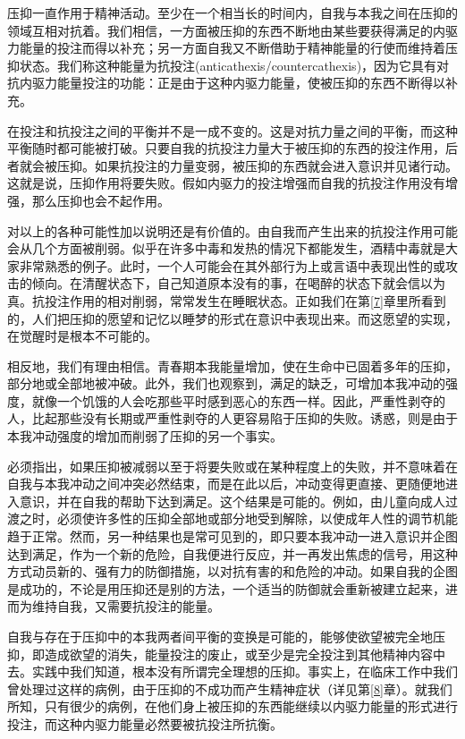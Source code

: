 \documentclass[UTF8,10pt,a4paper,openany]{book}
\begin{document}
压抑一直作用于精神活动。至少在一个相当长的时间内，自我与本我之间在压抑的领域互相对抗着。我们相信，一方面被压抑的东西不断地由某些要获得满足的内驱力能量的投注而得以补充；另一方面自我又不断借助于精神能量的行使而维持着压抑状态。我们称这种能量为抗投注(anticathexis/countercathexis)，因为它具有对抗内驱力能量投注的功能：正是由于这种内驱力能量，使被压抑的东西不断得以补充。

在投注和抗投注之间的平衡并不是一成不变的。这是对抗力量之间的平衡，而这种平衡随时都可能被打破。只要自我的抗投注力量大于被压抑的东西的投注作用，后者就会被压抑。如果抗投注的力量变弱，被压抑的东西就会进入意识并见诸行动。这就是说，压抑作用将要失败。假如内驱力的投注增强而自我的抗投注作用没有增强，那么压抑也会不起作用。

对以上的各种可能性加以说明还是有价值的。由自我而产生出来的抗投注作用可能会从几个方面被削弱。似乎在许多中毒和发热的情况下都能发生，酒精中毒就是大家非常熟悉的例子。此时，一个人可能会在其外部行为上或言语中表现出性的或攻击的倾向。在清醒状态下，自己知道原本没有的事，在喝醉的状态下就会信以为真。抗投注作用的相对削弱，常常发生在睡眠状态。正如我们在第\ref{7}章里所看到的，人们把压抑的愿望和记忆以睡梦的形式在意识中表现出来。而这愿望的实现，在觉醒时是根本不可能的。

相反地，我们有理由相信。青春期本我能量增加，使在生命中已固着多年的压抑，部分地或全部地被冲破。此外，我们也观察到，满足的缺乏，可增加本我冲动的强度，就像一个饥饿的人会吃那些平时感到恶心的东西一样。因此，严重性剥夺的人，比起那些没有长期或严重性剥夺的人更容易陷于压抑的失败。诱惑，则是由于本我冲动强度的增加而削弱了压抑的另一个事实。

必须指出，如果压抑被减弱以至于将要失败或在某种程度上的失败，并不意味着在自我与本我冲动之间冲突必然结束，而是在此以后，冲动变得更直接、更随便地进入意识，并在自我的帮助下达到满足。这个结果是可能的。例如，由儿童向成人过渡之时，必须使许多性的压抑全部地或部分地受到解除，以使成年人性的调节机能趋于正常。然而，另一种结果也是常可见到的，即只要本我冲动一进入意识并企图达到满足，作为一个新的危险，自我便进行反应，并一再发出焦虑的信号，用这种方式动员新的、强有力的防御措施，以对抗有害的和危险的冲动。如果自我的企图是成功的，不论是用压抑还是别的方法，一个适当的防御就会重新被建立起来，进而为维持自我，又需要抗投注的能量。

自我与存在于压抑中的本我两者间平衡的变换是可能的，能够使欲望被完全地压抑，即造成欲望的消失，能量投注的废止，或至少是完全投注到其他精神内容中去。实践中我们知道，根本没有所谓完全理想的压抑。事实上，在临床工作中我们曾处理过这样的病例，由于压抑的不成功而产生精神症状（详见第\ref{8}章）。就我们所知，只有很少的病例，在他们身上被压抑的东西能继续以内驱力能量的形式进行投注，而这种内驱力能量必然要被抗投注所抗衡。
\end{document}
